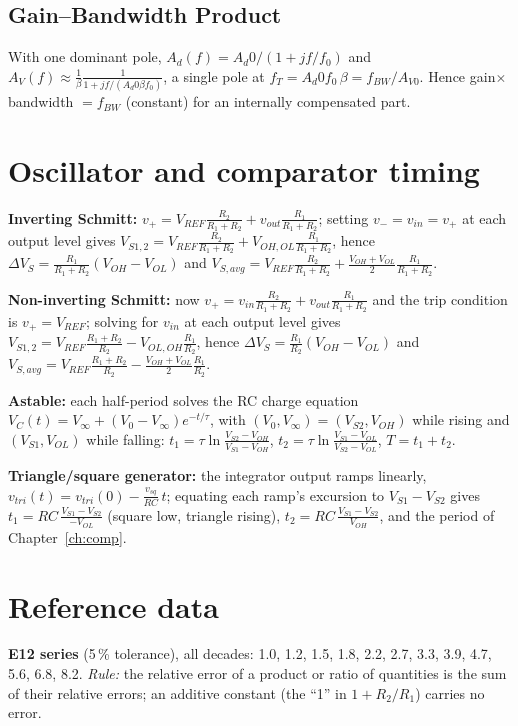 \documentclass[11pt,a4paper,oneside]{book}
\newcommand{\Ad}{A_d}
\begin{document}
\section{Gain--Bandwidth Product}\label{app:gbwp}
With one dominant pole, $\Ad(f)=\Ad0/(1+jf/f_0)$ and
$A_V(f)\approx\frac1\beta\frac1{1+jf/(\Ad0\beta f_0)}$, a single pole at
$f_T=\Ad0 f_0\,\beta=f_{BW}/A_{V0}$. Hence gain$\times$bandwidth $=f_{BW}$
(constant) for an internally compensated part.

\chapter{Oscillator and comparator timing}\label{app:osc}
\textbf{Inverting Schmitt:}
$v_+=V_{REF}\frac{R_2}{R_1+R_2}+v_{out}\frac{R_1}{R_1+R_2}$; setting
$v_-=v_{in}=v_+$ at each output level gives
$V_{S1,2}=V_{REF}\frac{R_2}{R_1+R_2}+V_{OH,OL}\frac{R_1}{R_1+R_2}$, hence
$\Delta V_S=\frac{R_1}{R_1+R_2}(V_{OH}-V_{OL})$ and
$V_{S,avg}=V_{REF}\frac{R_2}{R_1+R_2}+\frac{V_{OH}+V_{OL}}2\frac{R_1}{R_1+R_2}$.

\textbf{Non-inverting Schmitt:} now
$v_+=v_{in}\frac{R_2}{R_1+R_2}+v_{out}\frac{R_1}{R_1+R_2}$ and the trip
condition is $v_+=V_{REF}$; solving for $v_{in}$ at each output level gives
$V_{S1,2}=V_{REF}\frac{R_1+R_2}{R_2}-V_{OL,OH}\frac{R_1}{R_2}$, hence
$\Delta V_S=\frac{R_1}{R_2}(V_{OH}-V_{OL})$ and
$V_{S,avg}=V_{REF}\frac{R_1+R_2}{R_2}-\frac{V_{OH}+V_{OL}}2\frac{R_1}{R_2}$.

\textbf{Astable:} each half-period solves the RC charge equation
$V_C(t)=V_\infty+(V_0-V_\infty)e^{-t/\tau}$, with
$(V_0,V_\infty)=(V_{S2},V_{OH})$ while rising and $(V_{S1},V_{OL})$ while
falling:
$t_1=\tau\ln\frac{V_{S2}-V_{OH}}{V_{S1}-V_{OH}}$,
$t_2=\tau\ln\frac{V_{S1}-V_{OL}}{V_{S2}-V_{OL}}$, $T=t_1+t_2$.

\textbf{Triangle/square generator:} the integrator output ramps linearly,
$v_{tri}(t)=v_{tri}(0)-\frac{v_{sq}}{RC}\,t$; equating each ramp's excursion to
$V_{S1}-V_{S2}$ gives $t_1=RC\,\frac{V_{S1}-V_{S2}}{-V_{OL}}$ (square low,
triangle rising), $t_2=RC\,\frac{V_{S1}-V_{S2}}{V_{OH}}$, and the period of
Chapter~\ref{ch:comp}.

\chapter{Reference data}\label{app:e12}
\textbf{E12 series} (5\,\% tolerance), all decades:
1.0, 1.2, 1.5, 1.8, 2.2, 2.7, 3.3, 3.9, 4.7, 5.6, 6.8, 8.2.
\emph{Rule:} the relative error of a product or ratio of quantities is the sum of
their relative errors; an additive constant (the ``1'' in $1+R_2/R_1$) carries no
error.
\end{document}
